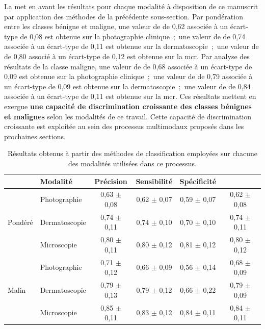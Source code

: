La  met en avant les résultats pour chaque modalité à disposition de ce manuscrit par application des méthodes de la précédente sous-section. Par pondération entre les classes bénigne et maligne, une valeur de \fscore{} de 0,62 associée à un écart-type de 0,08 est obtenue sur la photographie clinique~;~une valeur de \fscore{} de 0,74 associée à un écart-type de 0,11 est obtenue sur la dermatoscopie~;~une valeur de \fscore{} de 0,80 associé à un écart-type de 0,12 est obtenue sur la \gls{mcr}. Par analyse des résultats de la classe maligne, une valeur de \fscore{} de 0,68 associée à un écart-type de 0,09 est obtenue sur la photographie clinique~;~une valeur de \fscore{} de 0,79 associée à un écart-type de 0,09 est obtenue sur la dermatoscopie~;~une valeur de \fscore{} de 0,84 associée à un écart-type de 0,11 est obtenue sur la \gls{mcr}. Ces résultats mettent en exergue \textbf{une capacité de discrimination croissante des classes bénignes et malignes} selon les modalités de ce travail. Cette capacité de discrimination croissante est exploitée au sein des processus multimodaux proposés dans les prochaines sections.\par

\begin{table}[H]
    \centering
    \begin{tabular}{llcccc} \toprule
        \multicolumn{1}{l}{}     & Modalité      & Précision        & Sensibilité       & Spécificité       & \Fscore{}         \\ \midrule
        \multirow{3}{*}{Pondéré} & Photographie  & 0,63 $\pm$ 0,08  & 0,62 $\pm$ 0,07   & 0,59 $\pm$ 0,07   & 0,62 $\pm$ 0,08   \\
                                 & Dermatoscopie & 0,74 $\pm$ 0,11  & 0,74 $\pm$ 0,10   & 0,70 $\pm$ 0,10   & 0,74 $\pm$ 0,11   \\
                                 & Microscopie   & 0,80 $\pm$ 0,11  & 0,80 $\pm$ 0,12   & 0,81 $\pm$ 0,12   & 0,80 $\pm$ 0,12   \\ \midrule
        \multirow{3}{*}{Malin}   & Photographie  & 0,71 $\pm$ 0,12  & 0,66 $\pm$ 0,09   & 0,56 $\pm$ 0,14   & 0,68 $\pm$ 0,09   \\
                                 & Dermatoscopie & 0,79 $\pm$ 0,13  & 0,79 $\pm$ 0,12   & 0,66 $\pm$ 0,22   & 0,79 $\pm$ 0,09   \\
                                 & Microscopie   & 0,85 $\pm$ 0,11  & 0,83 $\pm$ 0,12   & 0,84 $\pm$ 0,11   & 0,84 $\pm$ 0,11   \\ \bottomrule
    \end{tabular}
    \caption{Résultats obtenus à partir des méthodes de classification employées sur chacune des modalités utilisées dans ce processus.}
    \label{tab:results_multimodality_modalities}
\end{table}

